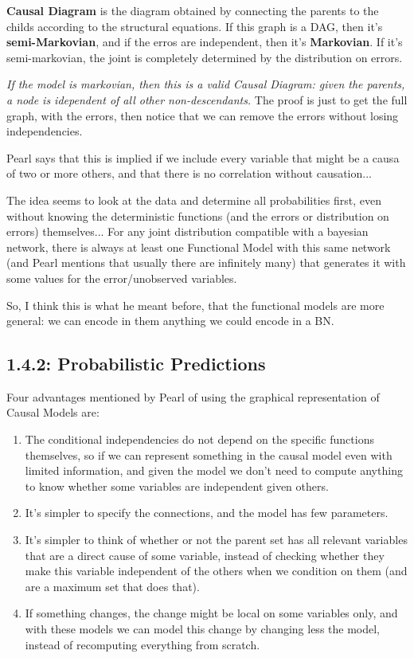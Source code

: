 \textbf{Causal Diagram} is the diagram obtained by connecting the parents to the childs according to the structural equations. If this graph is a DAG, then it's \textbf{semi-Markovian}, and if the erros are independent, then it's \textbf{Markovian}. If it's semi-markovian, the joint is completely determined by the distribution on errors.

\textit{If the model is markovian, then this is a valid Causal Diagram: given the parents, a node is idependent of all other non-descendants.} The proof is just to get the full graph, with the errors, then notice that we can remove the errors without losing independencies.

Pearl says that this is implied if we include every variable that might be a causa of two or more others, and that there is no correlation without causation...

The idea seems to look at the data and determine all probabilities first, even without knowing the deterministic functions (and the errors or distribution on errors) themselves... For any joint distribution compatible with a bayesian network, there is always at least one Functional Model with this same network (and Pearl mentions that usually there are infinitely many) that generates it with some values for the error/unobserved variables.

So, I think this is what he meant before, that the functional models are more general: we can encode in them anything we could encode in a BN.

\subsection{1.4.2: Probabilistic Predictions}

Four advantages mentioned by Pearl of using the graphical representation of Causal Models are:

\begin{enumerate}
    \item The conditional independencies do not depend on the specific functions themselves, so if we can represent something in the causal model even with limited information, and given the model we don't need to compute anything to know whether some variables are independent given others.
    \item It's simpler to specify the connections, and the model has few parameters.
    \item It's simpler to think of whether or not the parent set has all relevant variables that are a direct cause of some variable, instead of checking whether they make this variable independent of the others when we condition on them (and are a maximum set that does that).
    \item If something changes, the change might be local on some variables only, and with these models we can model this change by changing less the model, instead of recomputing everything from scratch.
\end{enumerate}


